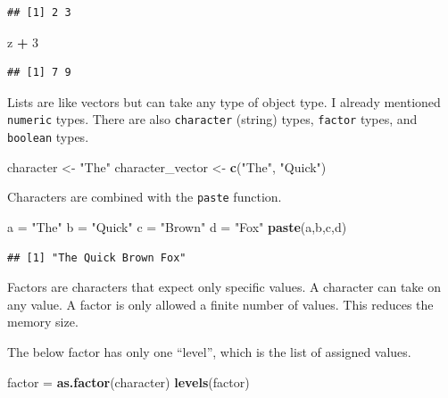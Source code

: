 \documentclass[]{book}
\newenvironment{Shaded}{\begin{snugshade}}{\end{snugshade}}
\newcommand{\DecValTok}[1]{\textcolor[rgb]{0.00,0.00,0.81}{#1}}
\newcommand{\KeywordTok}[1]{\textcolor[rgb]{0.13,0.29,0.53}{\textbf{#1}}}
\newcommand{\NormalTok}[1]{#1}
\newcommand{\OperatorTok}[1]{\textcolor[rgb]{0.81,0.36,0.00}{\textbf{#1}}}
\newcommand{\StringTok}[1]{\textcolor[rgb]{0.31,0.60,0.02}{#1}}
\begin{document}
\begin{verbatim}
## [1] 2 3
\end{verbatim}

\begin{Shaded}
\begin{Highlighting}[]
\NormalTok{z }\OperatorTok{+}\StringTok{ }\DecValTok{3}
\end{Highlighting}
\end{Shaded}

\begin{verbatim}
## [1] 7 9
\end{verbatim}

Lists are like vectors but can take any type of object type. I already mentioned \texttt{numeric} types. There are also \texttt{character} (string) types, \texttt{factor} types, and \texttt{boolean} types.

\begin{Shaded}
\begin{Highlighting}[]
\NormalTok{character <-}\StringTok{ "The"}
\NormalTok{character_vector <-}\StringTok{ }\KeywordTok{c}\NormalTok{(}\StringTok{"The"}\NormalTok{, }\StringTok{"Quick"}\NormalTok{)}
\end{Highlighting}
\end{Shaded}

Characters are combined with the \texttt{paste} function.

\begin{Shaded}
\begin{Highlighting}[]
\NormalTok{a =}\StringTok{ "The"}
\NormalTok{b =}\StringTok{ "Quick"}
\NormalTok{c =}\StringTok{ "Brown"}
\NormalTok{d =}\StringTok{ "Fox"}
\KeywordTok{paste}\NormalTok{(a,b,c,d)}
\end{Highlighting}
\end{Shaded}

\begin{verbatim}
## [1] "The Quick Brown Fox"
\end{verbatim}

Factors are characters that expect only specific values. A character can take on any value. A factor is only allowed a finite number of values. This reduces the memory size.

The below factor has only one ``level'', which is the list of assigned values.

\begin{Shaded}
\begin{Highlighting}[]
\NormalTok{factor =}\StringTok{ }\KeywordTok{as.factor}\NormalTok{(character)}
\KeywordTok{levels}\NormalTok{(factor)}
\end{Highlighting}
\end{Shaded}
\end{document}
